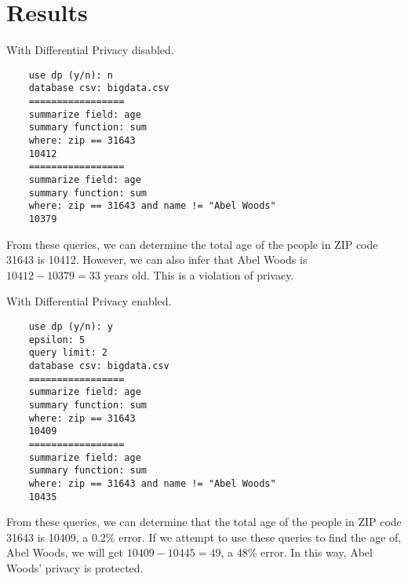 \documentclass[conference,11pt]{IEEEtran}
\begin{document}
\section{Results}\label{sec:results}

With Differential Privacy disabled.
\begin{verbatim}
    use dp (y/n): n
    database csv: bigdata.csv
    =================
    summarize field: age
    summary function: sum
    where: zip == 31643
    10412
    =================
    summarize field: age
    summary function: sum
    where: zip == 31643 and name != "Abel Woods"
    10379
\end{verbatim}
From these queries, we can determine the total age of the people in ZIP code
31643 is 10412. However, we can also infer that Abel Woods is $10412 - 10379 =
33$ years old. This is a violation of privacy.

With Differential Privacy enabled.
\begin{verbatim}
    use dp (y/n): y
    epsilon: 5
    query limit: 2
    database csv: bigdata.csv
    =================
    summarize field: age
    summary function: sum
    where: zip == 31643
    10409
    =================
    summarize field: age
    summary function: sum
    where: zip == 31643 and name != "Abel Woods"
    10435
\end{verbatim}
From these queries, we can determine that the total age of the people in ZIP
code 31643 is 10409, a 0.2\% error. If we attempt to use these queries to find
the age of, Abel Woods, we will get $10409 - 10445 = 49$, a 48\% error. In this
way, Abel Woods' privacy is protected.

\end{document}
